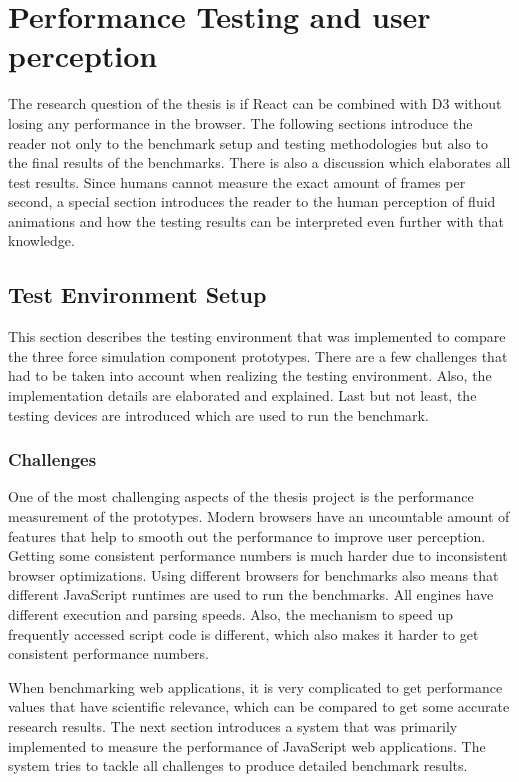 \chapter{Performance Testing and user perception}
\label{cha:performance}

The research question of the thesis is if React can be combined with D3 without losing any performance in the browser. The following sections introduce the reader not only to the benchmark setup and testing methodologies but also to the final results of the benchmarks. There is also a discussion which elaborates all test results. Since humans cannot measure the exact amount of frames per second, a special section introduces the reader to the human perception of fluid animations and how the testing results can be interpreted even further with that knowledge.

\section{Test Environment Setup}

This section describes the testing environment that was implemented to compare the three force simulation component prototypes. There are a few challenges that had to be taken into account when realizing the testing environment. Also, the implementation details are elaborated and explained. Last but not least, the testing devices are introduced which are used to run the benchmark.

\subsection{Challenges}

One of the most challenging aspects of the thesis project is the performance measurement of the prototypes. Modern browsers have an uncountable amount of features that help to smooth out the performance to improve user perception. Getting some consistent performance numbers is much harder due to inconsistent browser optimizations. Using different browsers for benchmarks also means that different JavaScript runtimes are used to run the benchmarks. All engines have different execution and parsing speeds. Also, the mechanism to speed up frequently accessed script code is different, which also makes it harder to get consistent performance numbers.

When benchmarking web applications, it is very complicated to get performance values that have scientific relevance, which can be compared to get some accurate research results. The next section introduces a system that was primarily implemented to measure the performance of JavaScript web applications. The system tries to tackle all challenges to produce detailed benchmark results.

